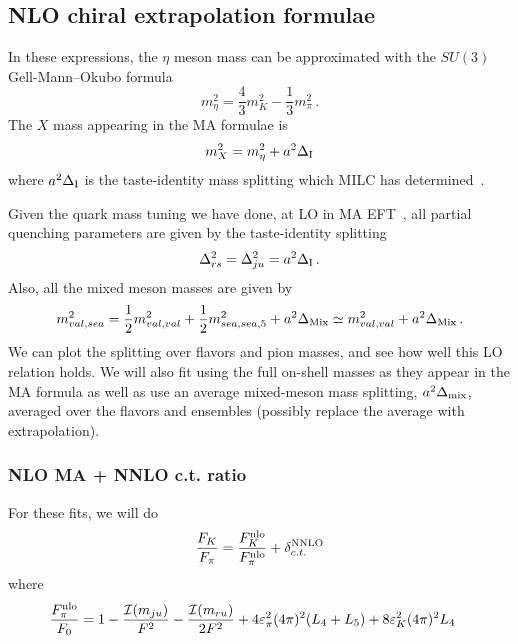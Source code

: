 \documentclass[prd,11pt,tightenlines,preprintnumbers,showpacs,superscriptaddress,notitlepage,nofootinbib,eqsecnum,floatfix,longbibliography]{revtex4-1}
\begin{document}
\subsection{NLO chiral extrapolation formulae}

In these expressions, the $\eta$ meson mass can be approximated with the $SU(3)$ Gell-Mann--Okubo formula
\begin{equation}
m_\eta^2 = \frac{4}{3} m_K^2 - \frac{1}{3}m_\pi^2\, .
\end{equation}
The $X$ mass appearing in the MA formulae is
\begin{equation}
m_X^2 = m_\eta^2 + a^2 {\Delta}_{\rm I}
\end{equation}
where $a^2 {\Delta}_{\rm I}$ is the taste-identity mass splitting which MILC has determined~\cite{Bazavov:2012xda}.

Given the quark mass tuning we have done, at LO in MA EFT~\cite{Chen:2006wf}, all partial quenching parameters are given by the taste-identity splitting
\begin{equation}
{\Delta}_{rs}^2 = {\Delta}_{ju}^2 = a^2 {\Delta}_{\rm I}\, .
\end{equation}
Also, all the mixed meson masses are given by
\begin{equation}
m_{val,sea}^2 = \frac{1}{2}m_{val,val}^2 + \frac{1}{2}m_{sea,sea,5}^2 + a^2 \Delta_{\rm Mix}
	\simeq m_{val,val}^2 + a^2 \Delta_{\rm Mix}\, .
\end{equation}
We can plot the splitting over flavors and pion masses, and see how well this LO relation holds.  We will also fit using the full on-shell masses as they appear in the MA formula as well as use an average mixed-meson mass splitting, $a^2 {\Delta}_{\rm mix}$, averaged over the flavors and ensembles (possibly replace the average with extrapolation).







\subsubsection{NLO MA + NNLO c.t. ratio}
For these fits, we will do
\begin{equation}
\frac{F_K}{F_\pi} = \frac{F_K^{\rm nlo}}{F_\pi^{\rm nlo}} + {\delta}_{c.t.}^{\rm NNLO}
\end{equation}
where
\begin{align}
\frac{F_\pi^{\rm nlo}}{F_0} &= 1
	- \frac{{\mathcal I}(m_{ju})}{F^2}
	-\frac{{\mathcal I}(m_{ru})}{2F^2}
	+4 {\varepsilon}_\pi^2 (4\pi)^2 (L_4 + L_5)
	+8 {\varepsilon}_K^2 (4\pi)^2 L_4
\end{align}
\end{document}
